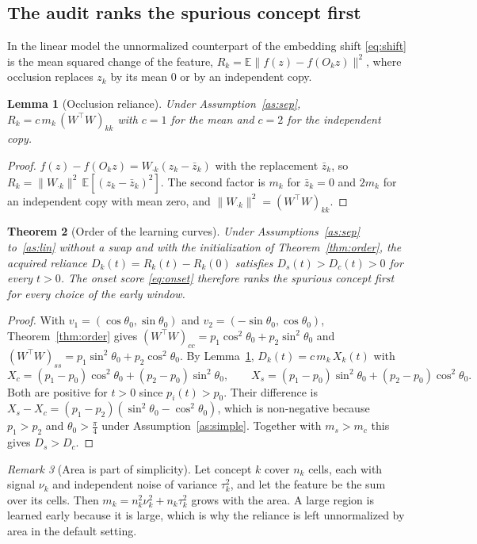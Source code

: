 \documentclass[11pt]{article}
\newtheorem{theorem}{Theorem}
\newtheorem{lemma}[theorem]{Lemma}
\theoremstyle{definition}
\theoremstyle{remark}
\newtheorem{remark}[theorem]{Remark}
\newcommand{\E}{\mathbb{E}}
\begin{document}
\subsection{The audit ranks the spurious concept first}

In the linear model the unnormalized counterpart of the embedding shift \eqref{eq:shift} is the mean squared change of
the feature, $R_k=\E\|f(z)-f(O_kz)\|^2$, where occlusion replaces $z_k$ by its mean $0$ or by an independent copy.

\begin{lemma}[Occlusion reliance]\label{lem:occ}
Under Assumption~\ref{as:sep}, $R_k=c\,m_k\,(W^\top W)_{kk}$ with $c=1$ for the mean and $c=2$ for the independent
copy.
\end{lemma}

\begin{proof}
$f(z)-f(O_kz)=W_{\cdot k}(z_k-\bar z_k)$ with the replacement $\bar z_k$, so
$R_k=\|W_{\cdot k}\|^2\,\E[(z_k-\bar z_k)^2]$. The second factor is $m_k$ for $\bar z_k=0$ and $2m_k$ for an
independent copy with mean zero, and $\|W_{\cdot k}\|^2=(W^\top W)_{kk}$.
\end{proof}

\begin{theorem}[Order of the learning curves]\label{thm:audit}
Under Assumptions~\ref{as:sep} to~\ref{as:lin} without a swap and with the initialization of
Theorem~\ref{thm:order}, the acquired reliance $D_k(t)=R_k(t)-R_k(0)$ satisfies $D_s(t)>D_c(t)>0$ for every $t>0$.
The onset score \eqref{eq:onset} therefore ranks the spurious concept first for every choice of the early window.
\end{theorem}

\begin{proof}
With $v_1=(\cos\theta_0,\sin\theta_0)$ and $v_2=(-\sin\theta_0,\cos\theta_0)$, Theorem~\ref{thm:order} gives
$(W^\top W)_{cc}=p_1\cos^2\theta_0+p_2\sin^2\theta_0$ and $(W^\top W)_{ss}=p_1\sin^2\theta_0+p_2\cos^2\theta_0$.
By Lemma~\ref{lem:occ}, $D_k(t)=c\,m_k\,X_k(t)$ with
\[
X_c=(p_1-p_0)\cos^2\theta_0+(p_2-p_0)\sin^2\theta_0,\qquad
X_s=(p_1-p_0)\sin^2\theta_0+(p_2-p_0)\cos^2\theta_0 .
\]
Both are positive for $t>0$ since $p_i(t)>p_0$. Their difference is
$X_s-X_c=(p_1-p_2)(\sin^2\theta_0-\cos^2\theta_0)$, which is non-negative because $p_1>p_2$ and
$\theta_0>\tfrac\pi4$ under Assumption~\ref{as:simple}. Together with $m_s>m_c$ this gives $D_s>D_c$.
\end{proof}

\begin{remark}[Area is part of simplicity]\label{rem:area}
Let concept $k$ cover $n_k$ cells, each with signal $\nu_k$ and independent noise of variance $\tau_k^2$, and let the
feature be the sum over its cells. Then $m_k=n_k^2\nu_k^2+n_k\tau_k^2$ grows with the area. A large region is learned
early because it is large, which is why the reliance is left unnormalized by area in the default setting.
\end{remark}
\end{document}
